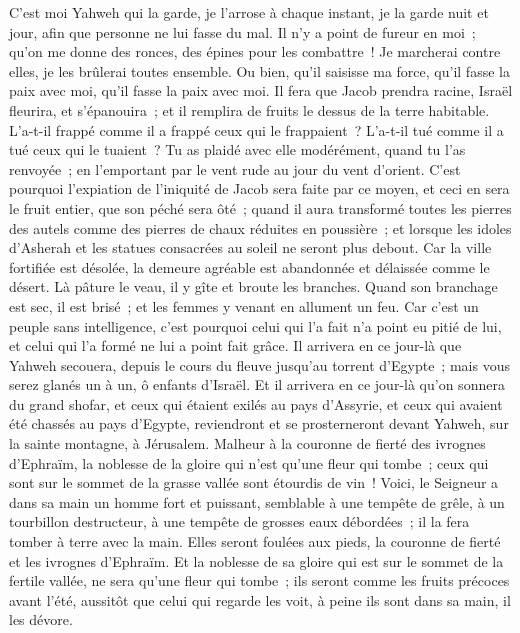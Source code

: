 \begin{multicols}{2}
C'est moi Yahweh qui la garde, je l'arrose à chaque instant, je la garde nuit et jour, afin que personne ne lui fasse du mal.
Il n'y a point de fureur en moi~; qu'on me donne des ronces, des épines pour les combattre~! Je marcherai contre elles, je les brûlerai toutes ensemble.
Ou bien, qu'il saisisse ma force, qu'il fasse la paix avec moi, qu'il fasse la paix avec moi.
Il fera que Jacob prendra racine, Israël fleurira, et s'épanouira~; et il remplira de fruits le dessus de la terre habitable.
L'a-t-il frappé comme il a frappé ceux qui le frappaient~? L'a-t-il tué comme il a tué ceux qui le tuaient~?
Tu as plaidé avec elle modérément, quand tu l'as renvoyée~; en l'emportant par le vent rude au jour du vent d'orient.
C'est pourquoi l'expiation de l'iniquité de Jacob sera faite par ce moyen, et ceci en sera le fruit entier, que son péché sera ôté~; quand il aura transformé toutes les pierres des autels comme des pierres de chaux réduites en poussière~; et lorsque les idoles d'Asherah et les statues consacrées au soleil ne seront plus debout.
Car la ville fortifiée est désolée, la demeure agréable est abandonnée et délaissée comme le désert. Là pâture le veau, il y gîte et broute les branches.
Quand son branchage est sec, il est brisé~; et les femmes y venant en allument un feu. Car c'est un peuple sans intelligence, c'est pourquoi celui qui l'a fait n'a point eu pitié de lui, et celui qui l'a formé ne lui a point fait grâce.
Il arrivera en ce jour-là que Yahweh secouera, depuis le cours du fleuve jusqu'au torrent d'Egypte~; mais vous serez glanés un à un, ô enfants d'Israël.
Et il arrivera en ce jour-là qu'on sonnera du grand shofar, et ceux qui étaient exilés au pays d'Assyrie, et ceux qui avaient été chassés au pays d'Egypte, reviendront et se prosterneront devant Yahweh, sur la sainte montagne, à Jérusalem.
\VerseOne{}Malheur à la couronne de fierté des ivrognes d'Ephraïm, la noblesse de la gloire qui n'est qu'une fleur qui tombe~; ceux qui sont sur le sommet de la grasse vallée sont étourdis de vin~!
Voici, le Seigneur a dans sa main un homme fort et puissant, semblable à une tempête de grêle, à un tourbillon destructeur, à une tempête de grosses eaux débordées~; il la fera tomber à terre avec la main.
Elles seront foulées aux pieds, la couronne de fierté et les ivrognes d'Ephraïm.
Et la noblesse de sa gloire qui est sur le sommet de la fertile vallée, ne sera qu'une fleur qui tombe~; ils seront comme les fruits précoces avant l'été, aussitôt que celui qui regarde les voit, à peine ils sont dans sa main, il les dévore.

\end{multicols}
